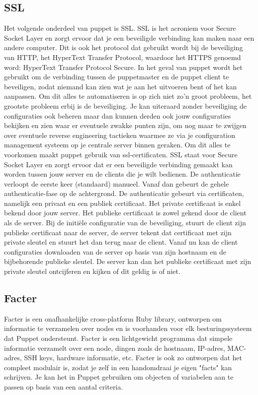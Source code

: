 \subsection{SSL}
Het volgende onderdeel van puppet is SSL. SSL is het acroniem voor Secure Socket Layer en zorgt ervoor dat je een beveiligde verbinding kan maken naar een andere computer. Dit is ook het protocol dat gebruikt wordt bij de beveiliging van HTTP, het HyperText Transfer Protocol, waardoor het HTTPS genoemd word: HyperText Transfer Protocol Secure. In het geval van puppet wordt het gebruikt om de verbinding tussen de puppetmaster en de puppet client te beveiligen, zodat niemand kan zien wat je aan het uitvoeren bent of het kan aanpassen.
%
Om dit alles te automatiseren is op zich niet zo'n groot probleem, het grootste probleem erbij is de beveiliging. Je kan uiteraard zonder beveiliging de configuraties ook beheren maar dan kunnen derden ook jouw configuraties bekijken en zien waar er eventuele zwakke punten zijn, om nog maar te zwijgen over eventuele reverse engineering tactieken waarmee ze via je configuration management systeem op je centrale server binnen geraken. Om dit alles te voorkomen maakt puppet gebruik van ssl-certificaten. SSL staat voor Secure Socket Layer en zorgt ervoor dat er een beveiligde verbinding gemaakt kan worden tussen jouw server en de clients die je wilt bedienen. De authenticatie verloopt de eerste keer (standaard) manueel. Vanaf dan gebeurt de gehele authenticatie-fase op de achtergrond. De authenticatie gebeurt via certificaten, namelijk een privaat en een publiek certificaat. Het private certificaat is enkel bekend door jouw server. Het publieke certificaat is zowel gekend door de client als de server. Bij de initi\"ele configuratie van de beveiliging, stuurt de client zijn publieke certificaat naar de server, de server tekent dat certificaat met zijn private sleutel en stuurt het dan terug naar de client. Vanaf nu kan de client configuraties downloaden van de server op basis van zijn hostnaam en de bijbehorende publieke sleutel. De server kan dan het publieke certificaat met zijn private sleutel ontcijferen en kijken of dit geldig is of niet.

\subsection{Facter}
Facter is een onafhankelijke cross-platform Ruby library, ontworpen om informatie te verzamelen over nodes en is voorhanden voor elk besturingssysteem dat Puppet ondersteunt. Facter is een lichtgewicht programma dat simpele informatie verzamelt over een node, dingen zoals de hostnaam, IP-adres, MAC-adres, SSH keys, hardware informatie, etc. Facter is ook zo ontworpen dat het compleet modulair is, zodat je zelf in een handomdraai je eigen "facts" kan schrijven. Je kan het in Puppet gebruiken om objecten of variabelen aan te passen op basis van een aantal criteria.
